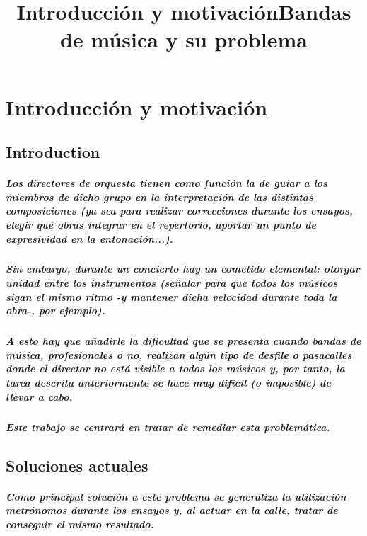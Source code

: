 \chapter{Introducción y motivación}
\title{Introducción y motivación}
\title{Bandas de música y su problema}
\section{Introduction}
\paragraph{
Los directores de orquesta tienen como función la de guiar a los miembros de dicho grupo en la interpretación de las distintas composiciones (ya sea para realizar correcciones durante los ensayos, elegir qué obras integrar en el repertorio, aportar un punto de expresividad en la entonación...).
}
\paragraph{
Sin embargo, durante un concierto hay un cometido elemental: otorgar unidad entre los instrumentos (señalar para que todos los músicos sigan el mismo ritmo -y mantener dicha velocidad durante toda la obra-, por ejemplo).
}
\paragraph{
A esto hay que añadirle la dificultad que se presenta cuando bandas de música, profesionales o no, realizan algún tipo de desfile o pasacalles donde el director no está visible a todos los músicos y, por tanto, la tarea descrita anteriormente se hace muy difícil (o imposible) de llevar a cabo.
}
\paragraph{
Este trabajo se centrará en tratar de remediar esta problemática.
}

\section{Soluciones actuales}
\paragraph{
Como principal solución a este problema se generaliza la utilización metrónomos durante los ensayos y, al actuar en la calle, tratar de conseguir el mismo resultado.
}

